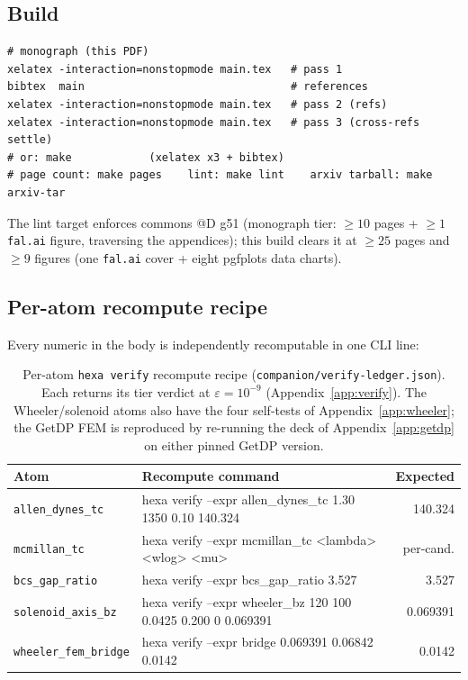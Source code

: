\subsection{Build}
\label{app:repro-build}

\begin{lstlisting}
# monograph (this PDF)
xelatex -interaction=nonstopmode main.tex   # pass 1
bibtex  main                                # references
xelatex -interaction=nonstopmode main.tex   # pass 2 (refs)
xelatex -interaction=nonstopmode main.tex   # pass 3 (cross-refs settle)
# or: make            (xelatex x3 + bibtex)
# page count: make pages    lint: make lint    arxiv tarball: make arxiv-tar
\end{lstlisting}
The lint target enforces commons @D g51 (monograph tier: $\ge\!10$ pages +
$\ge\!1$ \texttt{fal.ai} figure, traversing the appendices); this build
clears it at $\ge\!25$ pages and $\ge\!9$ figures (one \texttt{fal.ai}
cover + eight pgfplots data charts).

\subsection{Per-atom recompute recipe}
\label{app:repro-recompute}

Every numeric in the body is independently recomputable in one CLI line:

\begin{table}[h]
\centering
\small
\setlength{\tabcolsep}{4pt}
\begin{tabular}{@{}l >{\ttfamily\footnotesize}m{8.2cm} r@{}}
\toprule
\textbf{Atom} & \textbf{\normalfont Recompute command} & \textbf{Expected} \\
\midrule
\texttt{allen\_dynes\_tc} & hexa verify --expr allen\_dynes\_tc 1.30 1350 0.10 140.324 & 140.324 \\
\texttt{mcmillan\_tc}     & hexa verify --expr mcmillan\_tc <lambda> <wlog> <mu> & per-cand. \\
\texttt{bcs\_gap\_ratio}  & hexa verify --expr bcs\_gap\_ratio 3.527 & 3.527 \\
\texttt{solenoid\_axis\_bz} & hexa verify --expr wheeler\_bz 120 100 0.0425 0.200 0 0.069391 & 0.069391 \\
\texttt{wheeler\_fem\_bridge} & hexa verify --expr bridge 0.069391 0.06842 0.0142 & 0.0142 \\
\bottomrule
\end{tabular}
\caption{Per-atom \texttt{hexa verify} recompute recipe
(\texttt{companion/verify-ledger.json}). Each returns its tier verdict at
$\varepsilon=10^{-9}$ (Appendix~\ref{app:verify}). The Wheeler/solenoid
atoms also have the four self-tests of Appendix~\ref{app:wheeler}; the
GetDP FEM is reproduced by re-running the deck of Appendix~\ref{app:getdp}
on either pinned GetDP version.}
\label{tab:recompute}
\end{table}

